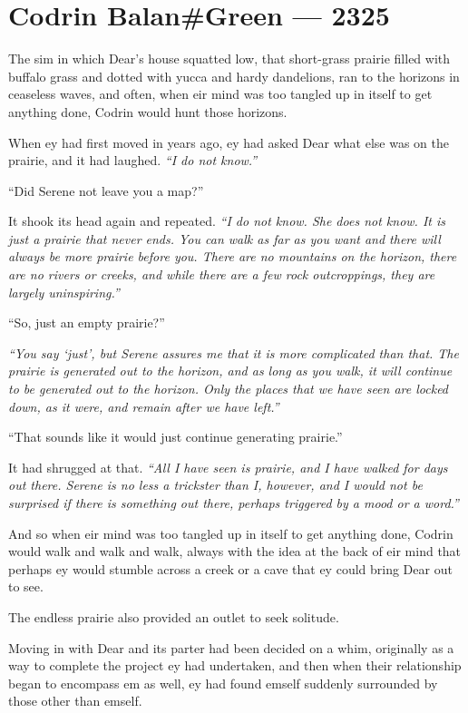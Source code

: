 \hypertarget{codrin-balangreen-2325}{%
\chapter{Codrin Balan\#Green — 2325}\label{codrin-balangreen-2325}}

The sim in which Dear's house squatted low, that short-grass prairie filled with buffalo grass and dotted with yucca and hardy dandelions, ran to the horizons in ceaseless waves, and often, when eir mind was too tangled up in itself to get anything done, Codrin would hunt those horizons.

When ey had first moved in years ago, ey had asked Dear what else was on the prairie, and it had laughed. \emph{``I do not know.''}

``Did Serene not leave you a map?''

It shook its head again and repeated. \emph{``I do not know. She does not know. It is just a prairie that never ends. You can walk as far as you want and there will always be more prairie before you. There are no mountains on the horizon, there are no rivers or creeks, and while there are a few rock outcroppings, they are largely uninspiring.''}

``So, just an empty prairie?''

\emph{``You say `just', but Serene assures me that it is more complicated than that. The prairie is generated out to the horizon, and as long as you walk, it will continue to be generated out to the horizon. Only the places that we have seen are locked down, as it were, and remain after we have left.''}

``That sounds like it would just continue generating prairie.''

It had shrugged at that. \emph{``All I have seen is prairie, and I have walked for days out there. Serene is no less a trickster than I, however, and I would not be surprised if there is something out there, perhaps triggered by a mood or a word.''}

And so when eir mind was too tangled up in itself to get anything done, Codrin would walk and walk and walk, always with the idea at the back of eir mind that perhaps ey would stumble across a creek or a cave that ey could bring Dear out to see.

The endless prairie also provided an outlet to seek solitude.

Moving in with Dear and its parter had been decided on a whim, originally as a way to complete the project ey had undertaken, and then when their relationship began to encompass em as well, ey had found emself suddenly surrounded by those other than emself.

